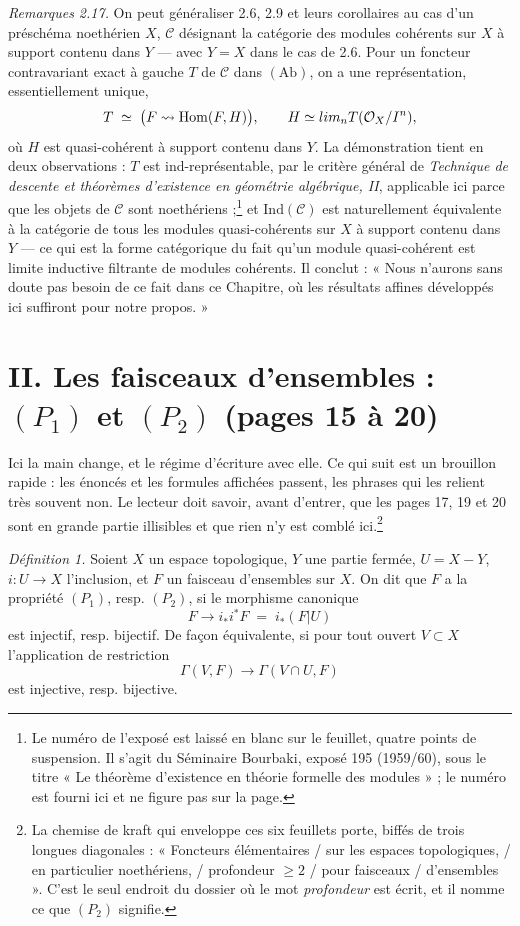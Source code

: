 \documentclass[11pt,a4paper]{article}
\begin{document}
\emph{Remarques 2.17.} On peut généraliser 2.6, 2.9 et leurs corollaires au cas
d'un préschéma noethérien $X$, $\mathcal{C}$ désignant la catégorie des modules
cohérents sur $X$ à support contenu dans $Y$ — avec $Y = X$ dans le cas de 2.6.
Pour un foncteur contravariant exact à gauche $T$ de $\mathcal{C}$ dans
$(\mathrm{Ab})$, on a une représentation, essentiellement unique,
\[
  T \;\simeq\; \big(F \rightsquigarrow \mathrm{Hom}(F,H)\big) ,
  \qquad H \simeq \varinjlim_{n} T(\mathcal{O}_{X}/I^{n}) ,
\]
où $H$ est quasi-cohérent à support contenu dans $Y$. La démonstration tient en
deux observations : $T$ est ind-représentable, par le critère général de
\emph{Technique de descente et théorèmes d'existence en géométrie algébrique,
II}, applicable ici parce que les objets de $\mathcal{C}$ sont
noethériens ;\footnote{Le numéro de l'exposé est laissé en blanc sur le
feuillet, quatre points de suspension. Il s'agit du Séminaire Bourbaki,
exposé 195 (1959/60), sous le titre « Le théorème d'existence en théorie
formelle des modules » ; le numéro est fourni ici et ne figure pas sur la page.}
et $\mathrm{Ind}(\mathcal{C})$ est naturellement équivalente à la catégorie de
tous les modules quasi-cohérents sur $X$ à support contenu dans $Y$ — ce qui est
la forme catégorique du fait qu'un module quasi-cohérent est limite inductive
filtrante de modules cohérents. Il conclut : « Nous n'aurons sans doute pas
besoin de ce fait dans ce Chapitre, où les résultats affines développés ici
suffiront pour notre propos. »

\section*{II. Les faisceaux d'ensembles : $(P_1)$ et $(P_2)$ (pages 15 à 20)}

Ici la main change, et le régime d'écriture avec elle. Ce qui suit est un
brouillon rapide : les énoncés et les formules affichées passent, les phrases
qui les relient très souvent non. Le lecteur doit savoir, avant d'entrer, que
les pages 17, 19 et 20 sont en grande partie illisibles et que rien n'y est
comblé ici.\footnote{La chemise de kraft qui enveloppe ces six feuillets porte,
biffés de trois longues diagonales : « Foncteurs élémentaires / sur les espaces
topologiques, / en particulier noethériens, / profondeur $\geqslant 2$ / pour
faisceaux / d'ensembles ». C'est le seul endroit du dossier où le mot
\emph{profondeur} est écrit, et il nomme ce que $(P_{2})$ signifie.}

\emph{Définition 1.} Soient $X$ un espace topologique, $Y$ une partie fermée,
$U = X - Y$, $i : U \to X$ l'inclusion, et $F$ un faisceau d'ensembles sur $X$.
On dit que $F$ a la propriété $(P_{1})$, resp. $(P_{2})$, si le morphisme
canonique
\[
  F \longrightarrow i_{*}i^{*}F \;=\; i_{*}(F|U)
\]
est injectif, resp. bijectif. De façon équivalente, si pour tout ouvert
$V \subset X$ l'application de restriction
\[
  \Gamma(V,F) \longrightarrow \Gamma(V \cap U, F)
\]
est injective, resp. bijective.
\end{document}
